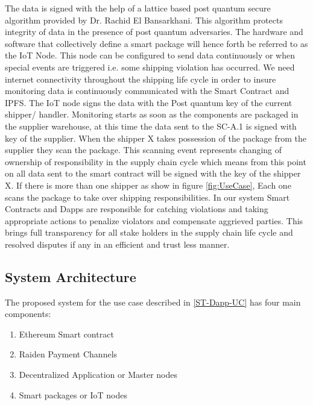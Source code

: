 The data is signed with the help of a lattice based post quantum secure algorithm provided by Dr. Rachid El Bansarkhani. This algorithm protects integrity of data in the presence of post quantum adversaries. The hardware and software that collectively define a smart package will hence forth be referred to as the IoT Node. This node can be configured to send data continuously or when special events are triggered i.e. some shipping violation has occurred. We need internet connectivity throughout the shipping life cycle in order to insure monitoring data is continuously communicated with the Smart Contract and IPFS. The IoT node signs the data with the Post quantum key of the current shipper/ handler.  Monitoring starts as soon as the components are packaged in the supplier warehouse, at this time the data sent to the SC-A.1 is signed with key of the supplier. When the shipper X takes possession of the package from the supplier they scan the package. This scanning event represents changing of ownership of responsibility in the supply chain cycle which means from this point on all data sent to the smart contract will be signed with the key of the shipper X. If there is more than one shipper as show in figure \ref{fig:UseCase}, Each one scans the package to take over shipping responsibilities. In our system Smart Contracts and Dapps are responsible for catching violations and taking appropriate actions to penalize violators and compensate aggrieved parties. This brings full transparency for all stake holders in the supply chain life cycle and resolved disputes if any in an efficient and trust less manner.

\vspace{0.5cm}
\subsection{System Architecture}
The proposed system for the use case described in \ref{ST-Dapp-UC} has four main components:
\begin{enumerate}
  \item Ethereum Smart contract
  \item Raiden Payment Channels
  \item Decentralized Application or Master nodes
  \item Smart packages or IoT nodes
\end{enumerate} 

